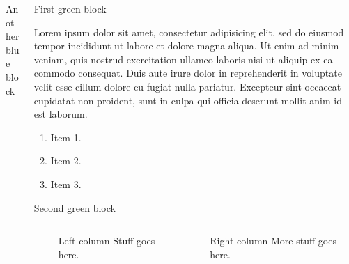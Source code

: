\documentclass[final]{beamer}
\begin{document}
\begin{frame}{}
\begin{columns}[t]
\begin{column}{.3\linewidth}
\begin{problockBlue}{Another blue block}
\end{problockBlue}

\end{column}


\begin{column}{.3\linewidth}
   
\begin{problockGreen}{First green block}

Lorem ipsum dolor sit amet, consectetur adipisicing elit, sed do eiusmod tempor incididunt ut labore et dolore magna aliqua. Ut enim ad minim veniam, quis nostrud exercitation ullamco laboris nisi ut aliquip ex ea commodo consequat. Duis aute irure dolor in reprehenderit in voluptate velit esse cillum dolore eu fugiat nulla pariatur. Excepteur sint occaecat cupidatat non proident, sunt in culpa qui officia deserunt mollit anim id est laborum.

\begin{enumerate}

\item Item 1.

\item Item 2.

\item Item 3.

\end{enumerate}
\end{problockGreen}


\begin{problockGreen}{Second green block}


\begin{columns}[t]
        ~~
	\begin{column}{.56\linewidth}
      \begin{block}{Left column}   
		Stuff goes here.
	  \end{block}
    \end{column}
		~
	\begin{column}{.4\linewidth}
      \begin{block}{Right column}   
		More stuff goes here.
	  \end{block}
    \end{column}
\end{columns}


\end{problockGreen}



\end{column}
\end{columns}
\end{frame}
\end{document}
